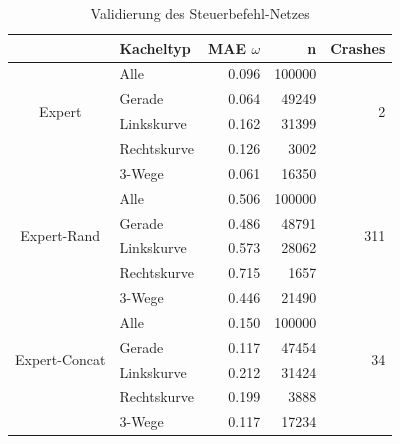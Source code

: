 \begin{table}[H]
	\centering
	\begin{tabular}[t]{|c|l|r|r|r|}
		\hline
		& \textbf{Kacheltyp} & \textbf{MAE $\omega$} & \textbf{n} & Crashes \\
		\hline
		\multirow{4}{*}{Expert} 
		& Alle
		& 0.096
		& 100000
		& \multirow{4}{*}{2}\\
		\cline{2-4}
		& Gerade
		&  0.064
		& 49249
		&\\
		\cline{2-4}
		& Linkskurve
		& 0.162
		& 31399
		&\\
		\cline{2-4}
		& Rechtskurve
		& 0.126
		& 3002
		&\\
		\cline{2-4}
		& 3-Wege
		&  0.061
		& 16350
		&\\
		\hline
		\multirow{4}{*}{Expert-Rand} 
		& Alle
		& 0.506
		& 100000
		& \multirow{4}{*}{311}\\
		\cline{2-4}
		& Gerade
		&  0.486
		& 48791
		& \\
		\cline{2-4}
		& Linkskurve
		& 0.573
		& 28062
		&\\
		\cline{2-4}
		& Rechtskurve
		& 0.715
		& 1657
		&\\
		\cline{2-4}
		& 3-Wege
		& 0.446
		& 21490
		&\\
		\hline
		\multirow{4}{*}{Expert-Concat} 
		& Alle
		& 0.150
		& 100000
		& \multirow{4}{*}{34}\\
		\cline{2-4}
		& Gerade
		& 0.117
		& 47454
		&\\
		\cline{2-4}
		& Linkskurve
		& 0.212
		& 31424
		&\\
		\cline{2-4}
		& Rechtskurve
		& 0.199
		& 3888
		&\\
		\cline{2-4}
		& 3-Wege
		& 0.117
		& 17234
		&\\
		\hline
	\end{tabular}
	\caption{Validierung des Steuerbefehl-Netzes}
	\label{expert-validation}
\end{table}


